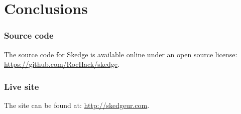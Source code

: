 
\chapter{Conclusions}

\subsection*{Source code}

The source code for Skedge is available online under an open source license:\\
\url{https://github.com/RocHack/skedge}.

\subsection*{Live site}

\noindent The site can be found at: \url{http://skedgeur.com}.